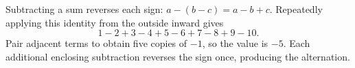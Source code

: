 Subtracting a sum reverses each sign: $a-(b-c)=a-b+c$. Repeatedly applying this identity from the outside inward gives
\[1-2+3-4+5-6+7-8+9-10.\]
Pair adjacent terms to obtain five copies of $-1$, so the value is $\boxed{-5}$. Each additional enclosing subtraction reverses the sign once, producing the alternation.
